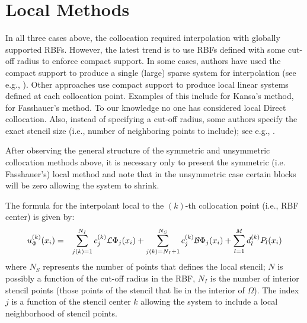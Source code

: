 \documentclass{report}
\begin{document}
{\section{Local Methods}
In all three cases above, the collocation required interpolation with globally supported RBFs. However, the latest trend is to use RBFs defined with some cut-off radius to enforce compact support. In some cases, authors have used the compact support to produce a single (large) sparse system for interpolation (see e.g., \cite{Wang:2002, Liu:2005, Correa:2007, Yang:2008, Lin:2009}). Other approaches use compact support to produce local linear systems defined at each collocation point. Examples of this include \cite{Sarler:2006, Vertnik:2006} for Kansa's method, \cite{Stevens:2008a, Stevens:2009a, Stevens:2009b} for Fasshauer's method. To our knowledge no one has considered local Direct collocation.  Also, instead of specifying a cut-off radius, some authors specify the exact stencil size (i.e., number of neighboring points to include); see e.g., \cite{Divo:2007, Stevens:2009b}. 

After observing the general structure of the symmetric and unsymmetric collocation methods above, it is necessary only to present the symmetric (i.e. Fasshauer's) local method and note that in the unsymmetric case certain blocks will be zero allowing the system to shrink. 

The formula for the interpolant local to the $(k)$-th collocation point (i.e., RBF center) is given by: 
\begin{eqnarray}
u^{(k)}_\Phi(x_i) & = & \sum_{j(k)=1}^{N_{I}}  c_j^{(k)} \mathcal{L}\Phi_j(x_i) + \sum_{j(k)=N_{I} + 1}^{N_{S}} c^{(k)}_j\mathcal{B}\Phi_j(x_i) + \sum_{l=1}^{M}d^{(k)}_l P_l(x_i)
\label{eqn:fasshauer_local_approx}
\end{eqnarray}
where $N_{S}$ represents the number of points that defines the local stencil; $N$ is possibly a function of the cut-off radius in the RBF, $N_{I}$ is the number of interior stencil points (those points of the stencil that lie in the interior of $\Omega$). The index $j$ is a function of the stencil center $k$ allowing the system to include a local neighborhood of stencil points.

}
\end{document}
